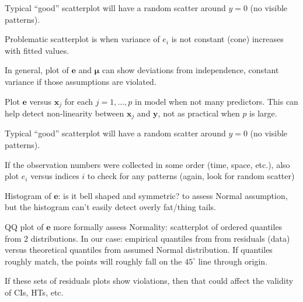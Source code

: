 Typical ``good'' scatterplot will have a random scatter
around $ y=0 $ (no visible patterns).

Problematic scatterplot is when
variance of $ e_i $ is not constant (cone)
increases with fitted values.

In general, plot of $ \symbf{e} $ and $ \hat{\symbf{\mu}} $
can show deviations from independence, constant variance if those
assumptions are violated.

Plot $ \symbf{e} $ versus $ \symbf{x}_j $ for each $ j=1,\ldots,p $
in model when not many predictors. This can help detect non-linearity
between $ \symbf{x}_j $ and $ \symbf{y} $, not as practical when
$ p $ is large.

Typical ``good'' scatterplot will have a random scatter
around $ y=0 $ (no visible patterns).

If the observation numbers were collected in some order
(time, space, etc.), also plot $ e_i $ versus indices
$ i $ to check for any patterns (again, look for random scatter)

Histogram of $ \symbf{e} $: is it bell shaped and symmetric?
to assess Normal assumption, but the histogram can't easily
detect overly fat/thing tails.

QQ plot of $ \symbf{e} $ more formally assess Normality:
scatterplot of ordered quantiles from 2 distributions.
In our case: empirical quantiles from from residuals (data)
versus theoretical quantiles from assumed Normal distribution.
If quantiles roughly match, the points will roughly fall
on the $ 45^\circ $ line through origin.

If these sets of residuals plots show violations, then that could
affect the validity of CIs, HTs, etc.


